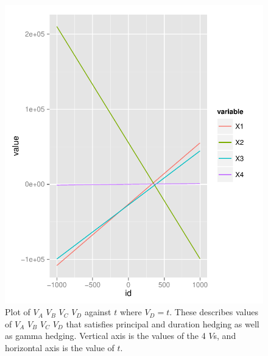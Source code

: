 \documentclass[11pt]{scrartcl}
\begin{document}
\begin{figure}[H]
\centering\includegraphics[width=\textwidth]{./hw3-gamma.pdf}
\caption{Plot of $V_A$ $V_B$ $V_C$ $V_D$ against $t$ where $V_D = t$. These describes values of $V_A$ $V_B$ $V_C$ $V_D$ that satisfies principal and duration hedging as well as gamma hedging. Vertical axis is the values of the 4 $V$s, and horizontal axis is the value of $t$.}
\end{figure}
\end{document}
